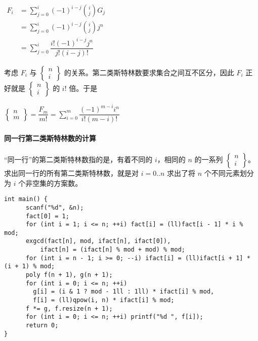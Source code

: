 \documentclass[]{article}
\let\oldparagraph\paragraph
\renewcommand{\paragraph}[1]{\oldparagraph{#1}\mbox{}}
\begin{document}
\(\begin{aligned} F_i&=\sum\limits_{j=0}^{i}(-1)^{i-j}\binom{i}{j}G_j\\ &=\sum\limits_{j=0}^{i}(-1)^{i-j}\binom{i}{j}j^n\\ &=\sum\limits_{j=0}^{i}\dfrac{i!(-1)^{i-j}j^n}{j!(i-j)!} \end{aligned}\)

考虑 \(F_i\) 与 \(\begin{Bmatrix}n\\i\end{Bmatrix}\)
的关系。第二类斯特林数要求集合之间互不区分，因此 \(F_i\) 正好就是
\(\begin{Bmatrix}n\\i\end{Bmatrix}\) 的 \(i!\) 倍。于是

\(\begin{Bmatrix}n\\m\end{Bmatrix}=\dfrac{F_m}{m!}=\sum\limits_{i=0}^m\dfrac{(-1)^{m-i}i^n}{i!(m-i)!}\)

\hypertarget{ux540cux4e00ux884cux7b2cux4e8cux7c7bux65afux7279ux6797ux6570ux7684ux8ba1ux7b97}{%
\paragraph{同一行第二类斯特林数的计算}\label{ux540cux4e00ux884cux7b2cux4e8cux7c7bux65afux7279ux6797ux6570ux7684ux8ba1ux7b97}}

``同一行''的第二类斯特林数指的是，有着不同的 \(i\)，相同的 \(n\)
的一系列
\(\begin{Bmatrix}n\\i\end{Bmatrix}\)。求出同一行的所有第二类斯特林数，就是对
\(i=0..n\) 求出了将 \(n\) 个不同元素划分为 \(i\) 个非空集的方案数。

\begin{verbatim}
int main() {
      scanf("%d", &n);
      fact[0] = 1;
      for (int i = 1; i <= n; ++i) fact[i] = (ll)fact[i - 1] * i % mod;
      exgcd(fact[n], mod, ifact[n], ifact[0]),
          ifact[n] = (ifact[n] % mod + mod) % mod;
      for (int i = n - 1; i >= 0; --i) ifact[i] = (ll)ifact[i + 1] * (i + 1) % mod;
      poly f(n + 1), g(n + 1);
      for (int i = 0; i <= n; ++i)
        g[i] = (i & 1 ? mod - 1ll : 1ll) * ifact[i] % mod,
        f[i] = (ll)qpow(i, n) * ifact[i] % mod;
      f *= g, f.resize(n + 1);
      for (int i = 0; i <= n; ++i) printf("%d ", f[i]);
      return 0;
}
\end{verbatim}
\end{document}

